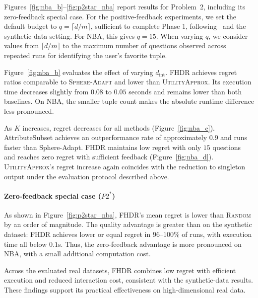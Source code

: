 \documentclass[conference]{IEEEtran}
\theoremstyle{definition}
\theoremstyle{plain}
\begin{document}
Figures~\ref{fig:nba_b}--\ref{fig:p2star_nba} report results for Problem~2, including its zero-feedback special case. For the positive-feedback experiments, we set the default budget to $q=\lceil d/m\rceil$, sufficient to complete Phase 1, following~\cite{LA24} and the synthetic-data setting. For NBA, this gives $q=15$. When varying $q$, we consider values from $\lceil d/m\rceil$ to the maximum number of questions observed across repeated runs for identifying the user’s favorite tuple.

Figure~\ref{fig:nba_b} evaluates the effect of varying $d_{\text{int}}$. \textsc{FHDR} achieves regret ratios comparable to \textsc{Sphere-Adapt} and lower than \textsc{UtilityApprox}. Its execution time decreases slightly from $0.08$ to $0.05$ seconds and remains lower than both baselines. On NBA, the smaller tuple count makes the absolute runtime difference less pronounced.

As \(K\) increases, regret decreases for all methods (Figure~\ref{fig:nba_c}). AttributeSubset achieves an outperformance rate of approximately 0.9 and runs faster than Sphere-Adapt. FHDR maintains low regret with only $15$ questions and reaches zero regret with sufficient feedback (Figure~\ref{fig:nba_d}). \textsc{UtilityApprox}'s regret increase again coincides with the reduction to singleton output under the evaluation protocol described above.

\paragraph*{Zero-feedback special case ($P2^{*}$)}
As shown in Figure~\ref{fig:p2star_nba}, FHDR’s mean regret is lower than \textsc{Random} by an order of magnitude. The quality advantage is greater than on the synthetic dataset: FHDR achieves lower or equal regret in $96$--$100\%$ of runs, with execution time all below $0.1$s. Thus, the zero-feedback advantage is more pronounced on NBA, with a small additional computation cost.

Across the evaluated real datasets, FHDR combines low regret with efficient execution and reduced interaction cost, consistent with the synthetic-data results. These findings support its practical effectiveness on high-dimensional real data.
\end{document}
